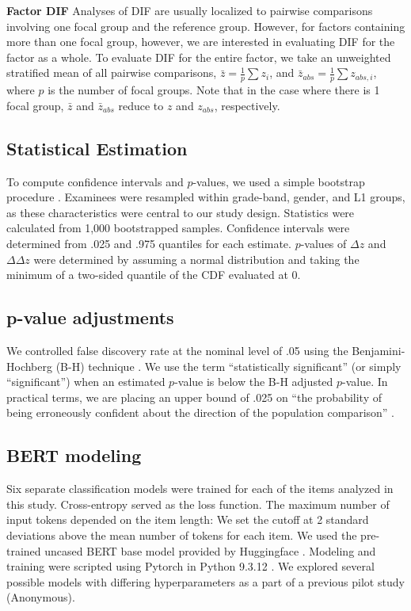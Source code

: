 \documentclass [PhD] {uclathes}
\begin{document}
\noindent \textbf{Factor DIF} \;
Analyses of DIF are usually localized to pairwise comparisons involving one focal group and the reference group. However, for factors containing more than one focal group, however, we are interested in evaluating DIF for the factor as a whole. To evaluate DIF for the entire factor, we take an unweighted stratified mean of all pairwise comparisons, $\bar{z} = \frac{1}{p} \sum{z_i}$, and $\bar{z}_{abs} = \frac{1}{p} \sum{z_{abs,i}}$, where $p$ is the number of focal groups. Note that in the case where there is 1 focal group, $\bar{z}$ and $\bar{z}_{abs}$ reduce to $z$ and $z_{abs}$, respectively.

\subsection{Statistical Estimation}
\label{meth_boot}

To compute confidence intervals and $p$-values, we used a simple bootstrap procedure \citep{efron1994}. Examinees were resampled within grade-band, gender, and L1 groups, as these characteristics were central to our study design. Statistics were calculated from 1,000 bootstrapped samples. Confidence intervals were determined from .025 and .975 quantiles for each estimate. $p$-values of $\Delta z$ and $\Delta \Delta z$ were determined by assuming a normal distribution and taking the minimum of a two-sided quantile of the CDF evaluated at 0. 

\subsection{p-value adjustments}
\label{meth_bh}

We controlled false discovery rate at the nominal level of .05 using the Benjamini-Hochberg (B-H) technique \cite{benjamini1995controlling}. We use the term “statistically significant” (or simply “significant”) when an estimated $p$-value is below the B-H adjusted $p$-value. In practical terms, we are placing an upper bound of .025 on “the probability of being erroneously confident about the direction of the population comparison” \cite[p. 43]{williams1999controlling}.

\subsection{BERT modeling}

Six separate classification models were trained for each of the items analyzed in this study. Cross-entropy served as the loss function. The maximum number of input tokens depended on the item length: We set the cutoff at 2 standard deviations above the mean number of tokens for each item. We used the pre-trained uncased BERT base model provided by Huggingface \citep{wolf_transformers_2020}. Modeling and training were scripted using Pytorch \citep{paszke_pytorch_2019} in Python 9.3.12 \citep{python_software_foundation_python_2022}. We explored several possible models with differing hyperparameters as a part of a previous pilot study (Anonymous). 
\end{document}
